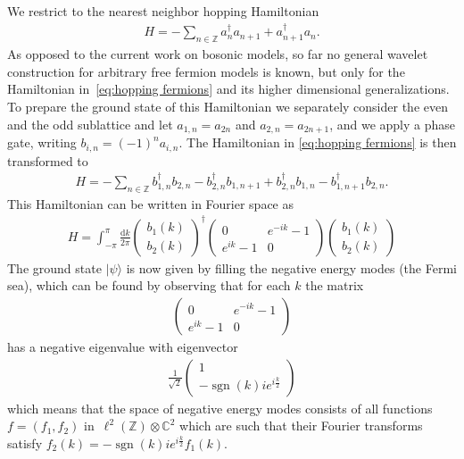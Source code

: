 \documentclass[submission, Phys]{SciPost}
\theoremstyle{definition}
\theoremstyle{remark}
\DeclareMathOperator{\sgn}{sgn}
\newcommand{\ket}[1]{\lvert#1\rangle}
\newcommand{\CC}{\mathbb C}
\newcommand{\ZZ}{\mathbb Z}
\newcommand{\ot}{\otimes}
\renewcommand{\d}{\ensuremath{\mathrm{d}}}
\begin{document}
\begin{appendix}
{We restrict to the nearest neighbor hopping Hamiltonian
\begin{align}\label{eq:hopping fermions}
  H = - \sum_{n \in \ZZ} a_n^\dagger a_{n+1} + a_{n+1}^\dagger a_n.
\end{align}
As opposed to the current work on bosonic models, so far no general wavelet construction for arbitrary free fermion models is known, but only for the Hamiltonian in~\cref{eq:hopping fermions} and its higher dimensional generalizations.
To prepare the ground state of this Hamiltonian we separately consider the even and the odd sublattice and let $a_{1,n} = a_{2n}$ and $a_{2,n} = a_{2n+1}$, and we apply a phase gate, writing $b_{i,n} = (-1)^n a_{i,n}$.
The Hamiltonian in \cref{eq:hopping fermions} is then transformed to
\begin{align}\label{eq:dirac fermion}
  H = -\sum_{n \in \ZZ} b_{1,n}^{\dagger}b_{2,n} - b_{2,n}^{\dagger} b_{1,n+1} + b_{2,n}^{\dagger}b_{1,n} - b_{1,n+1}^{\dagger}b_{2,n}.
\end{align}
This Hamiltonian can be written in Fourier space as
\begin{align*}
  H = \int_{-\pi}^{\pi} \frac{\d k}{2\pi} \begin{pmatrix} b_1(k) \\ b_2(k)\end{pmatrix}^\dagger \begin{pmatrix} 0 & e^{-ik} - 1 \\ e^{ik} - 1 & 0 \end{pmatrix} \begin{pmatrix} b_1(k) \\ b_2(k)\end{pmatrix}
\end{align*}
The ground state $\ket{\psi}$ is now given by filling the negative energy modes (the Fermi sea), which can be found by observing that for each $k$ the matrix
\begin{align*}
  \begin{pmatrix} 0 & e^{-ik} - 1 \\ e^{ik} - 1 & 0 \end{pmatrix}
\end{align*}
has a negative eigenvalue with eigenvector
\begin{align*}
  \frac{1}{\sqrt2}\begin{pmatrix} 1 \\ -\sgn(k)ie^{i\frac{k}{2}} \end{pmatrix}
\end{align*}
which means that the space of negative energy modes consists of all functions~$f = (f_1, f_2)$ in~$\ell^2(\ZZ) \ot \CC^2$ which are such that their Fourier transforms satisfy $f_2(k) = -\sgn(k)ie^{i\frac{k}{2}}f_1(k)$.
}
\end{appendix}
\end{document}
